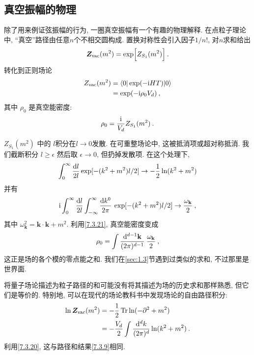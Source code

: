 \subsection*{真空振幅的物理}
除了用来例证弦振幅的行为, 一圈真空振幅有一个有趣的物理解释. 在点粒子理论中, ``真空''路径由任意$n$个不相交圆构成. 置换对称性会引入因子$1/n!$, 
对$n$求和给出
\begin{equation}
	\bm{Z}_{\mathrm{vac}}(m^{2})=\exp \Bigl[Z_{S_{1}}(m^{2})\Bigr] \:. \label{7.3.17}
\end{equation}
转化到正则场论
\begin{align}
	Z_{\mathrm{vac}}(m^{2}) &= \langle 0|\exp (-\mathrm{i} H T)| 0\rangle \nonumber \\
	&=\exp (-\mathrm{i} \rho_{0} V_{d}) \:, \label{7.3.18}
\end{align}
其中 $\rho_{0}$ 是真空能密度:
\begin{equation}
	\rho_{0}=\frac{\mathrm{i}}{V_{d}} Z_{S_{1}}(m^{2}) \:. \label{7.3.19}
\end{equation}

$Z_{S_{1}}(m^{2})$ 中的 $l$积分在$l \rightarrow 0 $发散. 在可重整场论中, 这被抵消项或超对称抵消. 
我们截断积分 $l \geq \epsilon$ 然后取 $\epsilon \rightarrow 0$, 但扔掉发散项. 在这个处理下,
\begin{equation}
	\int_{0}^{\infty} \frac{\mathrm{d} l}{2 l} \exp [-(k^{2}+m^{2}) l / 2] \rightarrow-\frac{1}{2} \ln(k^{2}+m^{2}) \label{7.3.20}
\end{equation}
并有
\begin{equation}
	\mathrm{i} \int_{0}^{\infty} \frac{\mathrm{d} l}{2 l} \int_{-\infty}^{\infty} \frac{\mathrm{d} k^{0}}{2 \pi} \: 
	\exp [-(k^{2}+m^{2})l/2] \rightarrow \frac{\omega_{\mathbf{k}}}{2} \:, \label{7.3.21}
\end{equation}
其中 $\omega_{\mathbf{k}}^{2}=\mathbf{k} \cdot \mathbf{k}+m^{2}$. 利用\eqref{7.3.21}, 真空能密度变成
\begin{equation}
	\rho_{0}=\int \frac{\mathrm{d}^{d-1} \mathbf{k}}{(2 \pi)^{d-1}} \: \frac{\omega_{\mathbf{k}}}{2} \:, \label{7.3.22}
\end{equation}
这正是场的各个模的零点能之和. 我们在\ref{sec:1.3}节遇到过类似的求和, 不过那里是世界面.

将量子场论描述为粒子路径的和可能没有将其描述为场的历史求和那样熟悉, 但它们是等价的. 特别地, 可以在现代的场论教科书中发现场论的自由路径积分:
	\begin{align}
		\ln \bm{Z}_{\mathrm{vac}}(m^{2}) &=-\frac{1}{2} \operatorname{Tr} \ln (-\partial^{2}+m^{2}) \nonumber \\
		&=-\frac{V_{d}}{2} \int \frac{\mathrm{d}^{d} k}{(2 \pi)^{d}} \ln (k^{2}+m^{2}) \:. \label{7.3.23}
	\end{align}
利用\eqref{7.3.20}, 这与路径和结果\eqref{7.3.9}相同.

